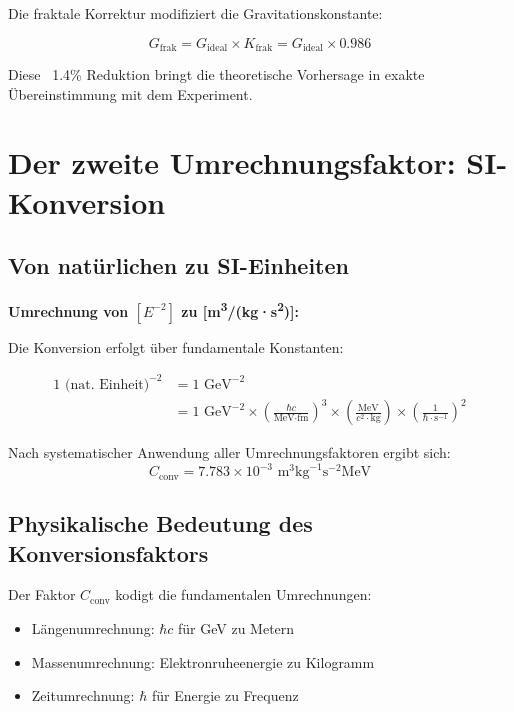 \documentclass[12pt,a4paper]{article}
\begin{document}
	Die fraktale Korrektur modifiziert die Gravitationskonstante:
	
	\begin{equation}
		G_{\text{frak}} = G_{\text{ideal}} \times K_{\text{frak}} = G_{\text{ideal}} \times 0.986
	\end{equation}
	
	Diese ~1.4\% Reduktion bringt die theoretische Vorhersage in exakte Übereinstimmung mit dem Experiment.
	
	\section{Der zweite Umrechnungsfaktor: SI-Konversion}
	
	\subsection{Von natürlichen zu SI-Einheiten}
	
	\begin{dimensional}
		\textbf{Umrechnung von $[E^{-2}]$ zu [m\textsuperscript{3}/(kg·s\textsuperscript{2})]:}
		
		Die Konversion erfolgt über fundamentale Konstanten:
		
		\begin{align}
			1 \text{ (nat. Einheit)}^{-2} &= 1 \text{ GeV}^{-2} \\
			&= 1 \text{ GeV}^{-2} \times \left(\frac{\hbar c}{\text{MeV·fm}}\right)^3 \times \left(\frac{\text{MeV}}{c^2 \cdot \text{kg}}\right) \times \left(\frac{1}{\hbar \cdot \text{s}^{-1}}\right)^2
		\end{align}
		
		Nach systematischer Anwendung aller Umrechnungsfaktoren ergibt sich:
		\begin{equation}
			C_{\text{conv}} = 7.783 \times 10^{-3} \text{ m}^3\text{kg}^{-1}\text{s}^{-2}\text{MeV}
		\end{equation}
	\end{dimensional}
	
	\subsection{Physikalische Bedeutung des Konversionsfaktors}
	
	Der Faktor $C_{\text{conv}}$ kodigt die fundamentalen Umrechnungen:
	\begin{itemize}
		\item Längenumrechnung: $\hbar c$ für GeV zu Metern
		\item Massenumrechnung: Elektronruheenergie zu Kilogramm
		\item Zeitumrechnung: $\hbar$ für Energie zu Frequenz
	\end{itemize}
	
\end{document}
